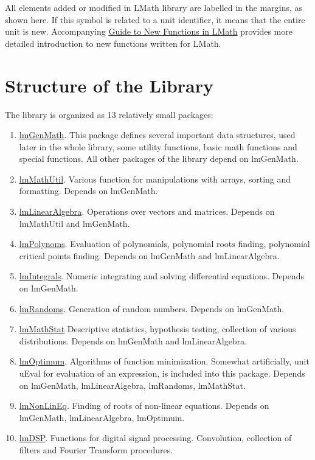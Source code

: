 \documentclass[12pt,a4paper,oneside]{report}
\newcommand{\lmath}[1]{   %
	\marginpar{\vspace{#1} 
		\begin{flushright}
			LMath
	\end{flushright} }
}
\begin{document}
All elements added or modified in LMath library are labelled in the margins, as shown here.\lmath{-28pt} If this symbol is related to a unit identifier, it means that the entire unit is new. Accompanying \href{LMath_NewFunc_guide}{Guide to New Functions in LMath} provides more detailed introduction to new functions written for LMath. 
\section{Structure of the Library}
The library is organized as 13 relatively small packages:
\begin{enumerate}
	\item{\hyperref[package-lmGenMath]{lmGenMath}.} This package defines several important data structures, used later in the whole library, some utility functions, basic math functions and special functions. All other packages of the library depend on lmGenMath.
	\item{\hyperref[package-lmMathUtil]{lmMathUtil}.} Various function for manipulations with arrays, sorting and formatting. Depends on lmGenMath.
	\item{\hyperref[package-lmLinearAlgebra]{lmLinearAlgebra}.} Operations over vectors and matrices. Depends on lmMathUtil and lmGenMath.
	\item{\hyperref[package-lmPolynoms]{lmPolynoms}.} Evaluation of polynomials, polynomial roots finding, polynomial critical points finding. Depends on lmGenMath and lmLinearAlgebra.
	\item{\hyperref[package-lmIntegrals]{lmIntegrals}.} Numeric integrating and solving differential equations. Depends on lmGenMath.
	\item{\hyperref[package-lmRandoms]{lmRandoms}.} Generation of random numbers. Depends on lmGenMath.
	\item{\hyperref[package-lmMathStat]{lmMathStat}} Descriptive statistics, hypothesis testing, collection of various distributions. Depends on lmGenMath and lmLinearAlgebra.
	\item{\hyperref[package-lmOptimum]{lmOptimum}.} Algorithms of function minimization. Somewhat artificially, unit uEval for evaluation of an expression, is included into this package. Depends on lmGenMath, lmLinearAlgebra, lmRandoms, lmMathStat.
	\item{\hyperref[package-lmNonLinEq]{lmNonLinEq}.} Finding of roots of non-linear equations. Depends on lmGenMath, lmLinearAlgebra, lmOptimum.
	\item{\hyperref[package-lmDSP]{lmDSP}. Functions for digital signal processing. Convolution, collection of filters and Fourier Transform procedures.}

\end{enumerate}
\end{document}
